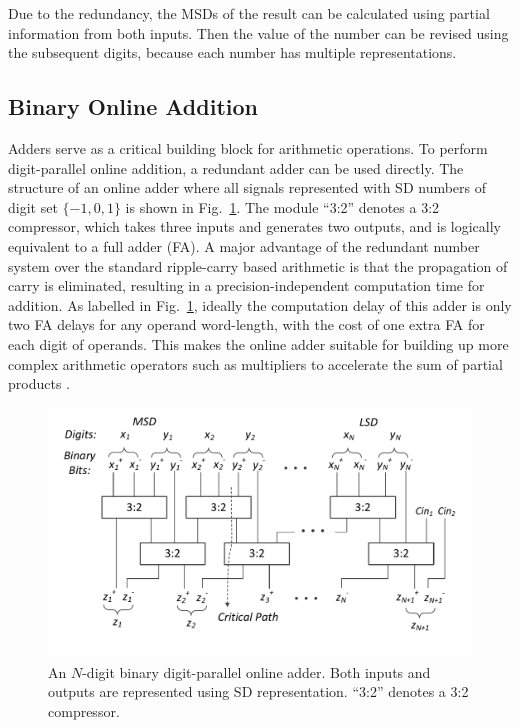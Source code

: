 \documentclass[conference]{IEEEtran}
\begin{document}
Due to the redundancy, the MSDs of the result can be calculated using partial information from both inputs. Then the value of the number can be revised using the subsequent digits, because each number has multiple representations.

\subsection{Binary Online Addition}
Adders serve as a critical building block for arithmetic operations. To perform digit-parallel online addition, a redundant adder can be used directly. The structure of an online adder where all signals represented with SD numbers of digit set $\{-1,0,1\}$ is shown in Fig.~\ref{Fig:Radix2SD_adder}. The module ``3:2'' denotes a 3:2 compressor, which takes three inputs and generates two outputs, and is logically equivalent to a full adder (FA). A major advantage of the redundant number system over the standard ripple-carry based arithmetic is that the propagation of carry is eliminated, resulting in a precision-independent computation time for addition. As labelled in Fig.~\ref{Fig:Radix2SD_adder}, ideally the computation delay of this adder is only two FA delays for any operand word-length, with the cost of one extra FA for each digit of operands. This makes the online adder suitable for building up more complex arithmetic operators such as multipliers to accelerate the sum of partial products \cite{RedundantMult_1987}.
%
\begin{figure}[tbp]
	\centering
	\includegraphics[width=.5\textwidth]{./Figures/SDAdder2.pdf}
    \vspace{-6ex}
	\caption{An $N$-digit binary digit-parallel online adder. Both inputs and outputs are represented using SD representation. ``3:2'' denotes a 3:2 compressor.}
    \vspace{-2ex}
	\label{Fig:Radix2SD_adder}
\end{figure}

\end{document}
